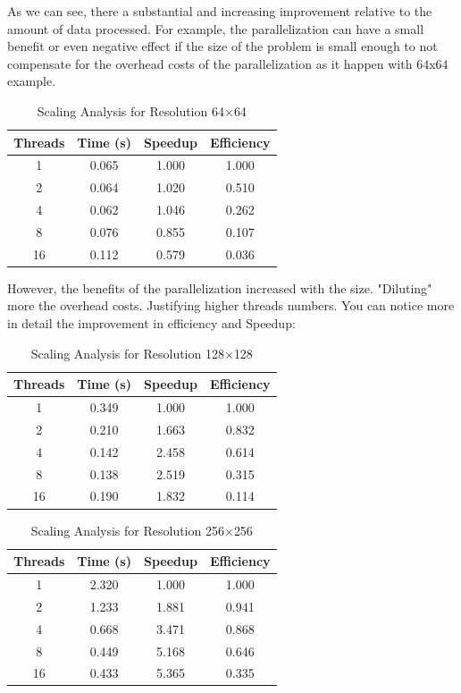 \documentclass[unicode,11pt,a4paper,oneside,numbers=endperiod,openany]{scrartcl}
\begin{document}
As we can see, there a substantial and increasing improvement relative 
to the amount of data processed. For example, the parallelization can have a small 
benefit or even negative effect if the size of the problem is small enough to not 
compensate for the overhead costs of the parallelization as it happen with $64$x$64$
example. 

\begin{table}[h!]
    \centering
    \caption{Scaling Analysis for Resolution 64$\times$64}
    \begin{tabular}{cccc}
        \toprule
        Threads & Time (s) & Speedup & Efficiency \\
        \midrule
        1  & 0.065 & 1.000 & 1.000 \\
        2  & 0.064 & 1.020 & 0.510 \\
        4  & 0.062 & 1.046 & 0.262 \\
        8  & 0.076 & 0.855 & 0.107 \\
        16 & 0.112 & 0.579 & 0.036 \\
        \bottomrule
    \end{tabular}
\end{table}

However, the benefits of the parallelization increased with the size. "Diluting" 
more the overhead costs. Justifying higher threads numbers. You can notice more in detail 
the improvement in efficiency and Speedup:

\begin{table}[h!]
    \centering
    \caption{Scaling Analysis for Resolution 128$\times$128}
    \begin{tabular}{cccc}
        \toprule
        Threads & Time (s) & Speedup & Efficiency \\
        \midrule
        1  & 0.349 & 1.000 & 1.000 \\
        2  & 0.210 & 1.663 & 0.832 \\
        4  & 0.142 & 2.458 & 0.614 \\
        8  & 0.138 & 2.519 & 0.315 \\
        16 & 0.190 & 1.832 & 0.114 \\
        \bottomrule
    \end{tabular}
\end{table}

\begin{table}[h!]
    \centering
    \caption{Scaling Analysis for Resolution 256$\times$256}
    \begin{tabular}{cccc}
        \toprule
        Threads & Time (s) & Speedup & Efficiency \\
        \midrule
        1  & 2.320 & 1.000 & 1.000 \\
        2  & 1.233 & 1.881 & 0.941 \\
        4  & 0.668 & 3.471 & 0.868 \\
        8  & 0.449 & 5.168 & 0.646 \\
        16 & 0.433 & 5.365 & 0.335 \\
        \bottomrule
    \end{tabular}
\end{table}
\end{document}

